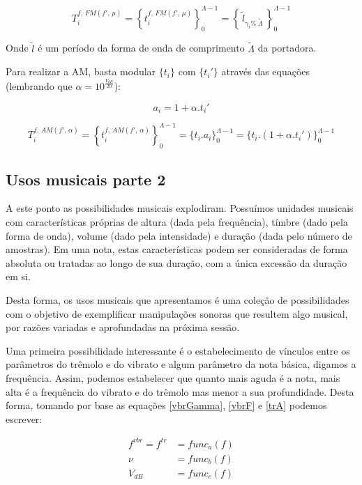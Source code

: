 \begin{equation}\label{fmT}
T_i^{f,\, FM(f',\,\mu)}=\left\{ t_i^{f,\,FM(f',\,\mu)} \right\}_0^{\Lambda-1}=\left\{\,\widetilde{l}_{\gamma_i \%\; \widetilde{\Lambda} } \,\right\}_0^{\Lambda-1}
\end{equation}

Onde $\widetilde{l}$ é um período da forma de onda de comprimento $\widetilde{\Lambda}$ da portadora.

Para realizar a AM, basta modular $\{t_i\}$ com $\{t_i'\}$ através das equações (lembrando que $\alpha=10^{\frac{V_{dB}}{20}}$):

\begin{equation}\label{amA}
a_i=1 + \alpha . t_i'
\end{equation}

\begin{equation}\label{trT}
T_i^{f,\,AM(f',\,\alpha)}=\left\{ t_i^{f,\,AM(f',\,\alpha)} \right\}_0^{\Lambda-1}=\{ t_i . a_i \}_0^{\Lambda-1}=\{t_i . (1 + \alpha . t_i')    \}_0^{\Lambda-1}
\end{equation}



\subsection{Usos musicais parte 2}
A este ponto as possibilidades musicais explodiram. Possuímos unidades
musicais com características próprias de altura (dada pela frequência),
tímbre (dado pela forma de onda),
volume (dado pela intensidade) e duração (dada pelo número de amostras).
Em uma nota, estas características podem ser consideradas
de forma absoluta ou tratadas ao longo de sua duração,
com a única excessão da duração em si.

Desta forma, os usos musicais que apresentamos é uma coleção de possibilidades
com o objetivo de exemplificar manipulações sonoras que resultem algo
musical, por razões variadas e aprofundadas na próxima sessão.

Uma primeira possibilidade interessante é o estabelecimento de vínculos
entre os parâmetros do trêmolo e do vibrato e algum parâmetro da nota básica,
digamos a frequência. Assim, podemos estabelecer que quanto mais aguda é a nota,
mais alta é a frequência do vibrato e do trêmolo mas menor a sua profundidade.
Desta forma, tomando por base as equações \ref{vbrGamma}, \ref{vbrF} e \ref{trA}
podemos escrever:

\begin{equation}
\begin{split}
f^{vbr} = f^{tr} & = func_a(f) \\
\nu & = func_b(f) \\
V_{dB} & = func_c(f)
\end{split}
\end{equation}

